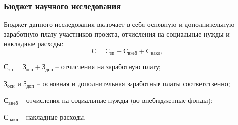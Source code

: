 \begin{table}[htbp]
{\begin{ganttchart}
\end{ganttchart}
}
\end{table}

\subsubsection{Бюджет научного исследования}


Бюджет данного исследования включает в себя основную и дополнительную заработную плату участников проекта, отчисления на социальные нужды и накладные расходы:
\begin{equation}\label{eq:F:budget}
    \text{С} = \text{С}_\text{зп} + \text{С}_\text{внеб} + \text{С}_\text{накл},
\end{equation}
\begin{where}
    \item $\text{С}_\text{зп} = \text{З}_\text{осн} + \text{З}_\text{доп}$ -- отчисления на заработную плату;
    \item $\text{З}_\text{осн}$ и $\text{З}_\text{доп}$ -- основная и дополнительная заработные платы соответственно; 
    \item $\text{С}_\text{внеб}$ -- отчисления на социальные нужды (во внебюджетные фонды);
    \item $\text{С}_\text{накл}$ -- накладные расходы.
\end{where}

